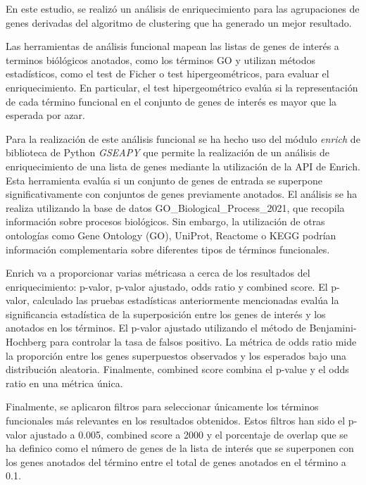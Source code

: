 En este estudio, se realizó un análisis de enriquecimiento para las agrupaciones de genes derivadas del algoritmo de clustering que ha generado un mejor resultado.

Las herramientas de análisis funcional mapean las listas de genes de interés a terminos biólógicos anotados, como los términos GO y utilizan métodos estadísticos, como el test de Ficher o test hipergeométricos,
para evaluar el enriquecimiento.\cite{10.1093/nar/gkn923} En particular, el test hipergeométrico evalúa si la representación de cada término funcional en el conjunto de genes de interés 
es mayor que la esperada por azar. 


Para la realización de este análisis funcional se ha hecho uso del módulo \textit{enrich} de biblioteca de Python \textit{GSEAPY} que permite la realización de un 
análisis de enriquecimiento de una lista de genes mediante la utilización de la API de Enrich. Esta herramienta evalúa si un conjunto de genes de entrada se superpone significativamente con conjuntos de genes previamente anotados. 
El análisis se ha realiza utilizando la base de datos  GO\_Biological\_Process\_2021, que recopila información sobre procesos biológicos. Sin embargo, la utilización de otras ontologías como 
Gene Ontology (GO), UniProt, Reactome o KEGG podrían  información complementaria sobre diferentes tipos de términos funcionales.

Enrich va a proporcionar varias métricasa a cerca de los resultados del enriquecimiento: p-valor, p-valor ajustado, odds ratio y combined score.
El p-valor, calculado las pruebas estadísticas anteriormente mencionadas evalúa la significancia estadística de la superposición entre los genes de interés y los anotados en los términos. El p-valor ajustado
utilizando el método de Benjamini-Hochberg para controlar la tasa de falsos positivo. La métrica de odds ratio mide la proporción entre los genes superpuestos observados y los esperados bajo una distribución aleatoria.
Finalmente, combined score combina el p-value y el odds ratio en una métrica única. \cite{maayanlab_enrichr_help}

Finalmente, se aplicaron filtros para seleccionar únicamente los términos funcionales más relevantes en los resultados obtenidos. Estos filtros han sido el p-valor ajustado a  0.005,
combined score a  2000 y el porcentaje de overlap que se ha definico como  el número de genes de la lista de interés que se superponen con los genes anotados del término entre el total de genes anotados en el término a 0.1.

